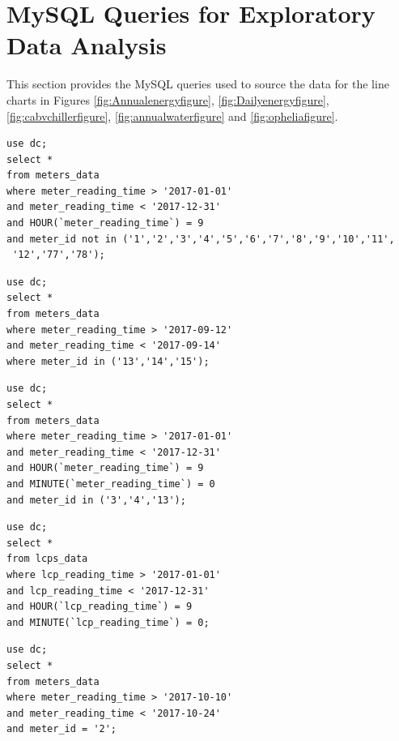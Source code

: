 \documentclass[12pt]{scrartcl}
\begin{document}
\newpage
\printbibliography
\newpage
\appendix
\appendixpage
\addappheadtotoc

\section{MySQL Queries for Exploratory Data Analysis}
\label{sec:[MySQL Queries]}
This section provides the MySQL queries used to source the data for the line charts in Figures \ref{fig:Annualenergyfigure}, \ref{fig:Dailyenergyfigure}, \ref{fig:cabvchillerfigure}, \ref{fig:annualwaterfigure} and \ref{fig:opheliafigure}.

\begin{lstlisting}[frame=single,basicstyle=\footnotesize\ttfamily,
  caption={Annual Energy Consumption},label={list:[Annual Energy Consumption]}]
use dc; 
select * 
from meters_data
where meter_reading_time > '2017-01-01'
and meter_reading_time < '2017-12-31'
and HOUR(`meter_reading_time`) = 9
and meter_id not in ('1','2','3','4','5','6','7','8','9','10','11',
 '12','77','78');
\end{lstlisting}

\begin{lstlisting}[frame=single,basicstyle=\footnotesize\ttfamily,
  caption={Daily Energy Consumption},label={list:[Daily Energy Consumption]}]
use dc; 
select * 
from meters_data
where meter_reading_time > '2017-09-12'
and meter_reading_time < '2017-09-14'
where meter_id in ('13','14','15');
\end{lstlisting}

\begin{lstlisting}[frame=single,basicstyle=\footnotesize\ttfamily,
  caption={Annual Energy Consumption of Chillers and Server},label={list:[Annual Energy Consumption of Chillers and Server]}]
use dc; 
select * 
from meters_data
where meter_reading_time > '2017-01-01'
and meter_reading_time < '2017-12-31'
and HOUR(`meter_reading_time`) = 9
and MINUTE(`meter_reading_time`) = 0
and meter_id in ('3','4','13');
\end{lstlisting}

\begin{lstlisting}[frame=single,basicstyle=\footnotesize\ttfamily,
  caption={Annual Water Flow},label={list:[Annual Water Flow]}]
use dc; 
select * 
from lcps_data
where lcp_reading_time > '2017-01-01'
and lcp_reading_time < '2017-12-31' 
and HOUR(`lcp_reading_time`) = 9
and MINUTE(`lcp_reading_time`) = 0;
\end{lstlisting}

\begin{lstlisting}[frame=single,basicstyle=\footnotesize\ttfamily,
  caption={Energy Consumption of the Generator during Storm Ophelia},label={list:[Energy Consumption of the Generator during Storm Ophelia]}]
use dc; 
select * 
from meters_data
where meter_reading_time > '2017-10-10'
and meter_reading_time < '2017-10-24'
and meter_id = '2';
\end{lstlisting}
\end{document}
